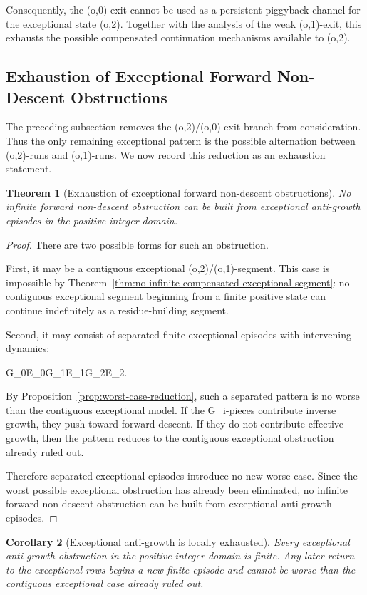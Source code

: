 \documentclass[11pt,letterpaper]{amsart}
\def\({}%
\def\){}%
\def\[{ }%
\def\]{ }%
\theoremstyle{definition}
\theoremstyle{plain}
\newtheorem{theorem}{Theorem}
\theoremstyle{plain}
\newtheorem{corollary}[theorem]{Corollary}
\theoremstyle{remark}
\begin{document}
Consequently, the \((o,0)\)-exit cannot be used as a persistent
piggyback channel for the exceptional state \((o,2)\).  Together with the
analysis of the weak \((o,1)\)-exit, this exhausts the possible
compensated continuation mechanisms available to \((o,2)\).

\subsection{Exhaustion of Exceptional Forward Non-Descent Obstructions}

The preceding subsection removes the \((o,2)/(o,0)\) exit branch from consideration.
Thus the only remaining exceptional pattern is the possible alternation between
\((o,2)\)-runs and \((o,1)\)-runs.  We now record this reduction as an exhaustion
statement.

\begin{theorem}[Exhaustion of exceptional forward non-descent obstructions]
\label{thm:exhaustion-exceptional-forward-nondescent}
No infinite forward non-descent obstruction can be built from exceptional
anti-growth episodes in the positive integer domain.
\end{theorem}

\begin{proof}
There are two possible forms for such an obstruction.

First, it may be a contiguous exceptional \((o,2)/(o,1)\)-segment.  This
case is impossible by
Theorem~\ref{thm:no-infinite-compensated-exceptional-segment}: no
contiguous exceptional segment beginning from a finite positive state can
continue indefinitely as a residue-building segment.

Second, it may consist of separated finite exceptional episodes with
intervening dynamics:
\[
G_0E_0G_1E_1G_2E_2\cdots .
\]
By Proposition~\ref{prop:worst-case-reduction}, such a separated pattern
is no worse than the contiguous exceptional model.  If the \(G_i\)-pieces
contribute inverse growth, they push toward forward descent.  If they do
not contribute effective growth, then the pattern reduces to the
contiguous exceptional obstruction already ruled out.

Therefore separated exceptional episodes introduce no new worse case.
Since the worst possible exceptional obstruction has already been
eliminated, no infinite forward non-descent obstruction can be built from
exceptional anti-growth episodes.
\end{proof}

\begin{corollary}[Exceptional anti-growth is locally exhausted]
\label{cor:exceptional-antigrowth-locally-exhausted}
Every exceptional anti-growth obstruction in the positive integer domain
is finite.  Any later return to the exceptional rows begins a new finite
episode and cannot be worse than the contiguous exceptional case already
ruled out.
\end{corollary}
\end{document}
